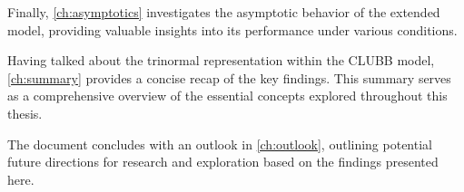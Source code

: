 Finally,
\cref{ch:asymptotics} investigates the asymptotic behavior of the extended model,
providing valuable insights into its performance under various conditions.

Having talked about the trinormal representation within the \gls{CLUBB} model,
\cref{ch:summary} provides a concise recap of the key findings.
This summary serves as a comprehensive overview of the essential concepts
explored throughout this thesis.

The document concludes with an outlook in \cref{ch:outlook},
outlining potential future directions for research
and exploration based on the findings presented here.
